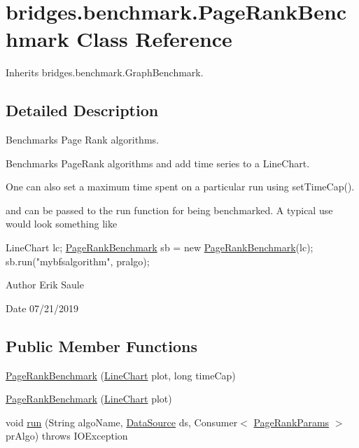 \hypertarget{classbridges_1_1benchmark_1_1_page_rank_benchmark}{}\section{bridges.\+benchmark.\+Page\+Rank\+Benchmark Class Reference}
\label{classbridges_1_1benchmark_1_1_page_rank_benchmark}


Inherits bridges.\+benchmark.\+Graph\+Benchmark.



\subsection{Detailed Description}
Benchmarks Page Rank algorithms. 

Benchmarks Page\+Rank algorithms and add time series to a Line\+Chart.

One can also set a maximum time spent on a particular run using set\+Time\+Cap().

and can be passed to the run function for being benchmarked. A typical use would look something like


\begin{DoxyCode}
LineChart lc;
\hyperlink{classbridges_1_1benchmark_1_1_page_rank_benchmark_afd361f9cae2425b44794e2599cc25af1}{PageRankBenchmark} sb  = \textcolor{keyword}{new} \hyperlink{classbridges_1_1benchmark_1_1_page_rank_benchmark_afd361f9cae2425b44794e2599cc25af1}{PageRankBenchmark}(lc);
sb.run(\textcolor{stringliteral}{"mybfsalgorithm"}, pralgo);
\end{DoxyCode}


\begin{DoxyAuthor}{Author}
Erik Saule 
\end{DoxyAuthor}
\begin{DoxyDate}{Date}
07/21/2019 
\end{DoxyDate}
\subsection*{Public Member Functions}
\begin{DoxyCompactItemize}
\item 
\hyperlink{classbridges_1_1benchmark_1_1_page_rank_benchmark_afd361f9cae2425b44794e2599cc25af1}{Page\+Rank\+Benchmark} (\hyperlink{classbridges_1_1base_1_1_line_chart}{Line\+Chart} plot, long time\+Cap)
\item 
\hyperlink{classbridges_1_1benchmark_1_1_page_rank_benchmark_a3a74e3703d4bc24b02a9dcb59b976792}{Page\+Rank\+Benchmark} (\hyperlink{classbridges_1_1base_1_1_line_chart}{Line\+Chart} plot)
\item 
void \hyperlink{classbridges_1_1benchmark_1_1_page_rank_benchmark_a11db60d5359cf391cd74fcc5fcfb9f3e}{run} (String algo\+Name, \hyperlink{classbridges_1_1connect_1_1_data_source}{Data\+Source} ds, Consumer$<$ \hyperlink{classbridges_1_1benchmark_1_1_page_rank_params}{Page\+Rank\+Params} $>$ pr\+Algo)  throws I\+O\+Exception 
\end{DoxyCompactItemize}


